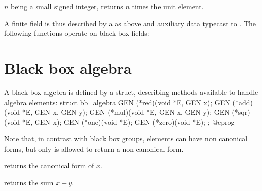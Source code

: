  $n$ being a small signed integer, returns $n$ times the unit element.

A finite field is thus described by a  as above and auxiliary
data typecast to . The following functions operate on black box
fields:













\section{Black box algebra}

A black box algebra is defined by a  struct, describing methods
available to handle algebra elements:
\bprog
struct bb_algebra
{
  GEN (*red)(void *E, GEN x);
  GEN (*add)(void *E, GEN x, GEN y);
  GEN (*mul)(void *E, GEN x, GEN y);
  GEN (*sqr)(void *E, GEN x);
  GEN (*one)(void *E);
  GEN (*zero)(void *E);
};
@eprog

Note that, in contrast with black box groups, elements can have non canonical
forms, but only  is allowed to return a non canonical form.

 returns the canonical form of $x$.

 returns the sum $x+y$.

